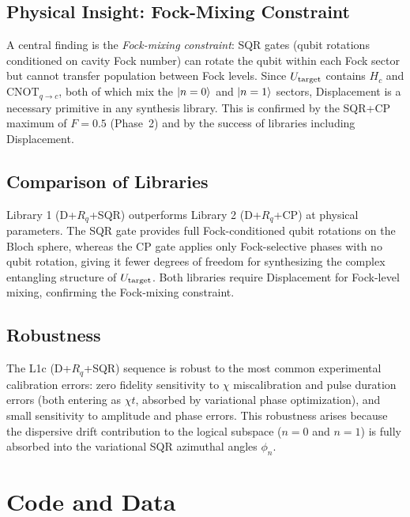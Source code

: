 \documentclass[11pt,a4paper]{article}
\newcommand{\Utarget}{U_{\rm target}}
\begin{document}
\subsection{Physical Insight: Fock-Mixing Constraint}

A central finding is the \emph{Fock-mixing constraint}: SQR gates (qubit
rotations conditioned on cavity Fock number) can rotate the qubit within each
Fock sector but cannot transfer population between Fock levels.  Since
$\Utarget$ contains $H_c$ and $\mathrm{CNOT}_{q\to c}$, both of which mix
the $\ket{n=0}$ and $\ket{n=1}$ sectors, Displacement is a necessary primitive
in any synthesis library.  This is confirmed by the SQR+CP maximum of $F=0.5$
(Phase~2) and by the success of libraries including Displacement.

\subsection{Comparison of Libraries}

Library 1 (D+$R_q$+SQR) outperforms Library 2 (D+$R_q$+CP) at physical
parameters.  The SQR gate provides full Fock-conditioned qubit rotations
on the Bloch sphere, whereas the CP gate applies only Fock-selective phases
with no qubit rotation, giving it fewer degrees of freedom for synthesizing
the complex entangling structure of $\Utarget$.  Both libraries require
Displacement for Fock-level mixing, confirming the Fock-mixing constraint.

\subsection{Robustness}

The L1c (D+$R_q$+SQR) sequence is robust to the most common experimental
calibration errors: zero fidelity sensitivity to $\chi$ miscalibration
and pulse duration errors (both entering as $\chi t$, absorbed by variational
phase optimization), and small sensitivity to amplitude and phase errors.
This robustness arises because the dispersive drift contribution to the
logical subspace ($n=0$ and $n=1$) is fully absorbed into the variational
SQR azimuthal angles $\phi_n$.

\appendix
\section{Code and Data}
\end{document}
